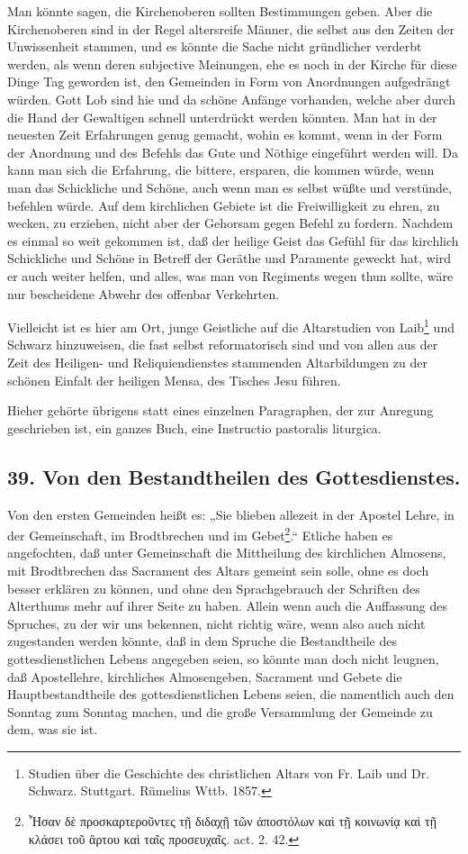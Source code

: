 Man könnte sagen, die Kirchenoberen sollten Bestimmungen geben. Aber die Kirchenoberen sind in der Regel altersreife Männer, die selbst aus den Zeiten der Unwissenheit stammen, und es könnte die Sache nicht gründlicher verderbt werden, als wenn deren subjective Meinungen, ehe es noch in der Kirche für diese Dinge Tag geworden ist, den Gemeinden
in Form von Anordnungen aufgedrängt würden. Gott Lob sind hie und da schöne Anfänge vorhanden, welche aber durch die Hand der Gewaltigen schnell unterdrückt werden könnten. Man hat in der neuesten Zeit Erfahrungen genug gemacht, wohin es kommt, wenn in der Form der Anordnung und des Befehls das Gute und Nöthige eingeführt werden will. Da kann man sich die Erfahrung, die bittere, ersparen, die kommen würde, wenn man das Schickliche und Schöne, auch wenn man es selbst wüßte und verstünde, befehlen würde. Auf dem kirchlichen Gebiete ist die Freiwilligkeit zu ehren, zu wecken, zu erziehen, nicht aber der Gehorsam gegen Befehl zu fordern. Nachdem es einmal so weit gekommen ist, daß der heilige Geist das Gefühl für das kirchlich Schickliche und Schöne in Betreff der Geräthe und Paramente geweckt hat, wird er auch weiter helfen, und alles, was man von Regiments wegen thun sollte, wäre nur bescheidene Abwehr des offenbar Verkehrten.

Vielleicht ist es hier am Ort, junge Geistliche auf die Altarstudien von Laib\footnote{Studien über die Geschichte des christlichen Altars von Fr. Laib und Dr. Schwarz. Stuttgart. Rümelius Wttb. 1857.} und Schwarz hinzuweisen, die fast selbst reformatorisch sind und von allen aus der Zeit des Heiligen- und Reliquiendienstes stammenden Altarbildungen zu der schönen Einfalt der heiligen Mensa, des Tisches Jesu führen.

Hieher gehörte übrigens statt eines einzelnen Paragraphen, der zur Anregung geschrieben ist, ein ganzes Buch, eine Instructio pastoralis liturgica.

\subsection*{39. Von den Bestandtheilen des Gottesdienstes.}

Von den ersten Gemeinden heißt es: „Sie blieben allezeit in der Apostel Lehre, in der Gemeinschaft, im Brodtbrechen und im Gebet\footnote{Ἦσαν δὲ προσκαρτεροῦντες τῇ διδαχῇ τῶν ἀποστόλων καὶ τῇ κοινωνίᾳ καὶ τῇ κλάσει τοῦ ἄρτου καὶ ταῖς προσευχαῖς. act. 2. 42.}.“ Etliche haben es angefochten, daß unter Gemeinschaft die Mittheilung des kirchlichen Almosens, mit Brodtbrechen das Sacrament des Altars gemeint sein solle, ohne es doch besser erklären zu können, und ohne den Sprachgebrauch der Schriften des Alterthums mehr auf ihrer Seite zu haben. Allein wenn auch die Auffassung des Spruches, zu der wir uns bekennen, nicht richtig wäre, wenn also auch nicht zugestanden werden könnte, daß in dem Spruche die Bestandtheile des gottesdienstlichen Lebens angegeben seien, so könnte man doch nicht leugnen, daß Apostellehre, kirchliches Almosengeben, Sacrament und Gebete die Hauptbestandtheile des gottesdienstlichen Lebens seien, die namentlich auch den Sonntag zum Sonntag machen, und die große Versammlung der Gemeinde zu dem, was sie ist.

